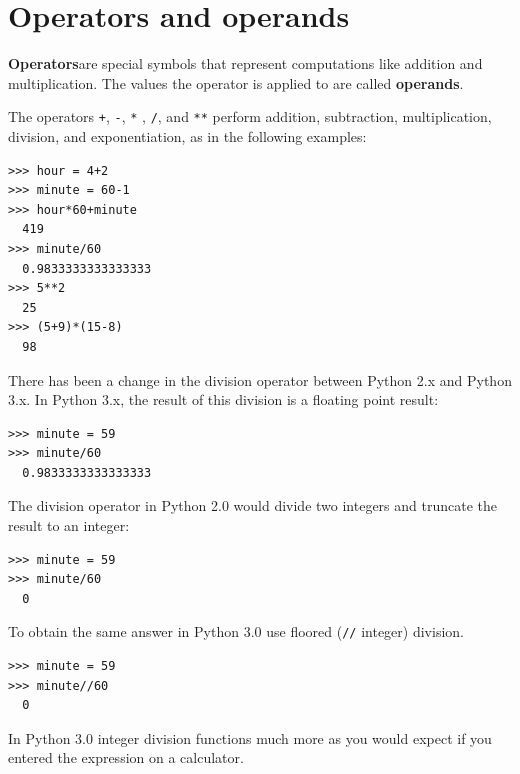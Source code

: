 \hypertarget{operadores-y-operandos}{%
\section{Operators and operands}\label{operadores-y-operandos}}

 
 

\begin{definition}
\textbf{Operators}are special symbols that represent computations like addition and multiplication. The values the operator is applied to are called \textbf{operands}.
\end{definition}

The operators \texttt{+}, \texttt{-}, \texttt{*} , \texttt{/}, and \texttt{**}
perform addition, subtraction, multiplication, division, and exponentiation, as in the following examples:

\begin{Verbatim}[frame=single]
>>> hour = 4+2
>>> minute = 60-1
>>> hour*60+minute
  419
>>> minute/60
  0.9833333333333333
>>> 5**2
  25
>>> (5+9)*(15-8)
  98
\end{Verbatim}

There has been a change in the division operator between Python 2.x and Python 3.x. In Python 3.x, the result of this division is a floating point result:

\begin{Verbatim}[frame=single]
>>> minute = 59
>>> minute/60
  0.9833333333333333
\end{Verbatim}

The division operator in Python 2.0 would divide two integers and truncate the result to an integer:

\begin{Verbatim}[frame=single]
>>> minute = 59
>>> minute/60
  0
\end{Verbatim}


To obtain the same answer in Python 3.0 use floored (\texttt{//} integer) division.

\begin{Verbatim}[frame=single]
>>> minute = 59
>>> minute//60
  0
\end{Verbatim}

In Python 3.0 integer division functions much more as you would expect if you entered the expression on a calculator.

  
 

